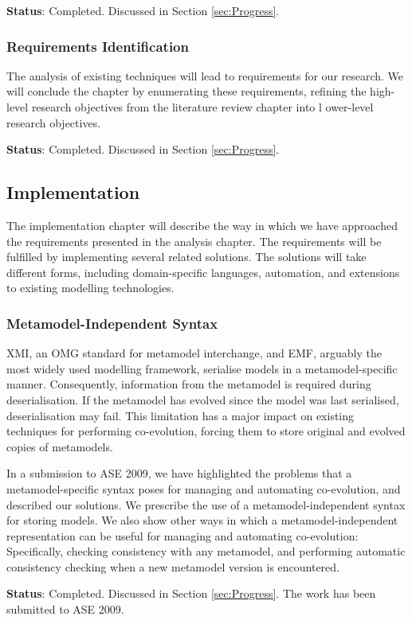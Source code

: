 \textbf{Status}: Completed. Discussed in Section \ref{sec:Progress}.


\subsubsection{Requirements Identification}
The analysis of existing techniques will lead to requirements for our research. We will conclude the chapter by enumerating these requirements, refining the high-level research objectives from the literature review chapter into l
ower-level research objectives.

\textbf{Status}: Completed. Discussed in Section \ref{sec:Progress}.


\subsection{Implementation}
The implementation chapter will describe the way in which we have approached the requirements presented in the analysis chapter. The requirements will be fulfilled by implementing several related solutions. The solutions will take different forms, including domain-specific languages, automation, and extensions to existing modelling technologies.

\subsubsection{Metamodel-Independent Syntax}
XMI, an OMG standard for metamodel interchange, and EMF, arguably the most widely used modelling framework, serialise models in a metamodel-specific manner. Consequently, information from the metamodel is required during deserialisation. If the metamodel has evolved since the model was last serialised, deserialisation may fail. This limitation has a major impact on existing techniques for performing co-evolution, forcing them to store original and evolved copies of metamodels. 

In a submission to ASE 2009, we have highlighted the problems that a metamodel-specific syntax poses for managing and automating co-evolution, and described our solutions. We prescribe the use of a metamodel-independent syntax for storing models. We also show other ways in which a metamodel-independent representation can be useful for managing and automating co-evolution: Specifically, checking consistency with any metamodel, and performing automatic consistency checking when a new metamodel version is encountered.

\textbf{Status}: Completed. Discussed in Section \ref{sec:Progress}. The work has been submitted to ASE 2009.


